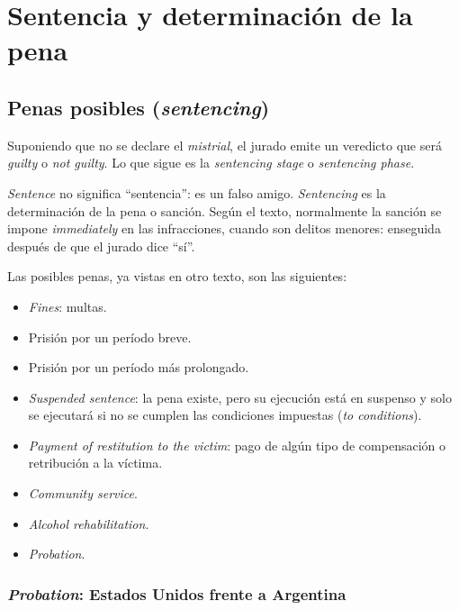 \documentclass[12pt,oneside]{book}
\begin{document}
\chapter[Sentencia y determinación de la pena]{Sentencia y determinación de la pena}

\section{Penas posibles (\textit{sentencing})}

Suponiendo que no se declare el \textit{mistrial}, el jurado emite un veredicto que será \textit{guilty} o \textit{not guilty}. Lo que sigue es la \textit{sentencing stage} o \textit{sentencing phase}.

\begin{important}
\textit{Sentence} no significa ``sentencia'': es un falso amigo. \textit{Sentencing} es la determinación de la pena o sanción. Según el texto, normalmente la sanción se impone \textit{immediately} en las infracciones, cuando son delitos menores: enseguida después de que el jurado dice ``sí''.
\end{important}

Las posibles penas, ya vistas en otro texto, son las siguientes:

\begin{itemize}
    \item \textit{Fines}: multas.
    \item Prisión por un período breve.
    \item Prisión por un período más prolongado.
    \item \textit{Suspended sentence}: la pena existe, pero su ejecución está en suspenso y solo se ejecutará si no se cumplen las condiciones impuestas (\textit{to conditions}).
    \item \textit{Payment of restitution to the victim}: pago de algún tipo de compensación o retribución a la víctima.
    \item \textit{Community service}.
    \item \textit{Alcohol rehabilitation}.
    \item \textit{Probation}.
\end{itemize}

\subsection{\textit{Probation}: Estados Unidos frente a Argentina}
\end{document}

